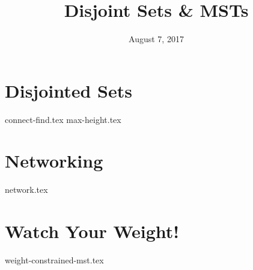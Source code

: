 \documentclass{exam}
\title{Disjoint Sets \& MSTs}
\date{August 7, 2017}
\begin{document}
\maketitle

\section{Disjointed Sets}
\begin{questions}
{connect-find.tex}
{max-height.tex}
\end{questions}

\clearpage

\section{Networking}
\begin{questions}
{network.tex}
\end{questions}

\clearpage

\section{Watch Your Weight!}
\begin{questions}
{weight-constrained-mst.tex}
\end{questions}
\end{document}
